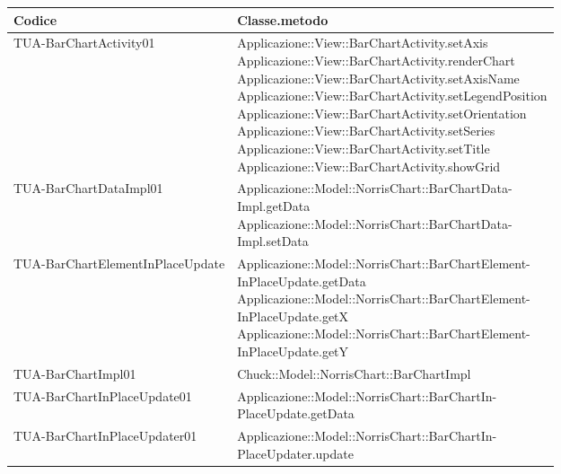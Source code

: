 
\begin{longtabu} spread 1cm [c]{|p{6cm}|p{8cm}|}
\hline
\rowfont{\bf \centering}
Codice &
Classe.metodo \\

\hline
\endhead

TUA-BarChartActivity01 & \parbox[t]{4cm}{
 Applicazione::View::BarChartActivity.setAxis \\
Applicazione::View::BarChartActivity.renderChart \\
Applicazione::View::BarChartActivity.setAxisName \\
Applicazione::View::BarChartActivity.setLegendPosition \\
Applicazione::View::BarChartActivity.setOrientation \\
Applicazione::View::BarChartActivity.setSeries \\
Applicazione::View::BarChartActivity.setTitle \\
Applicazione::View::BarChartActivity.showGrid }\\

\hline
TUA-BarChartDataImpl01 & \parbox[t]{4cm}{
 Applicazione::Model::NorrisChart::BarChartData-\\Impl.getData \\
Applicazione::Model::NorrisChart::BarChartData-\\Impl.setData }\\

\hline
TUA-BarChartElementInPlaceUpdate & \parbox[t]{4cm}{
 Applicazione::Model::NorrisChart::BarChartElement-\\InPlaceUpdate.getData \\
Applicazione::Model::NorrisChart::BarChartElement-\\InPlaceUpdate.getX \\
Applicazione::Model::NorrisChart::BarChartElement-\\InPlaceUpdate.getY }\\

\hline
TUA-BarChartImpl01 & \parbox[t]{4cm}{
 Chuck::Model::NorrisChart::BarChartImpl }\\

\hline
TUA-BarChartInPlaceUpdate01 & \parbox[t]{4cm}{
 Applicazione::Model::NorrisChart::BarChartIn-\\PlaceUpdate.getData }\\

\hline
TUA-BarChartInPlaceUpdater01 & \parbox[t]{4cm}{
 Applicazione::Model::NorrisChart::BarChartIn-\\PlaceUpdater.update }\\


\end{longtabu}
